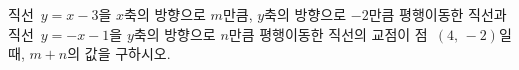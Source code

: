 직선~$y=x-3$을 $x$축의 방향으로 $m$만큼, $y$축의 방향으로 $-2$만큼 평행이동한 직선과 직선~$y=-x-1$을 $y$축의 방향으로 $n$만큼 평행이동한 직선의 교점이 점~$(4,\,-2)$일 때, $m+n$의 값을 구하시오.
